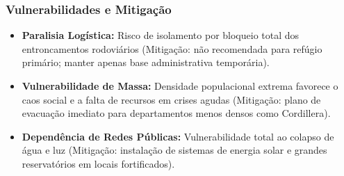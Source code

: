 \subsubsection{Vulnerabilidades e
Mitigação}

\begin{itemize}
\tightlist
\item
  \textbf{Paralisia Logística:} Risco de isolamento por bloqueio total
  dos entroncamentos rodoviários (Mitigação: não recomendada para
  refúgio primário; manter apenas base administrativa temporária).
\item
  \textbf{Vulnerabilidade de Massa:} Densidade populacional extrema
  favorece o caos social e a falta de recursos em crises agudas
  (Mitigação: plano de evacuação imediato para departamentos menos
  densos como Cordillera).
\item
  \textbf{Dependência de Redes Públicas:} Vulnerabilidade total ao
  colapso de água e luz (Mitigação: instalação de sistemas de energia
  solar e grandes reservatórios em locais fortificados).
\end{itemize}


